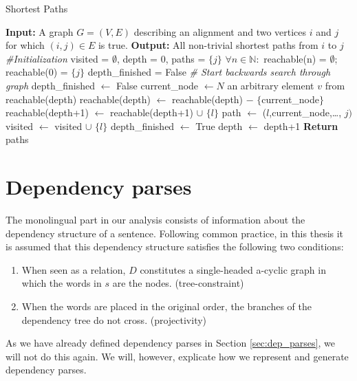 \begin{algorithm}
\caption{Shortest Paths}\label{alg:shortest paths}
\begin{algorithmic}
\STATE \textbf{Input:} A graph $G = (V,E)$ describing an alignment and two vertices $i$ and $j$ for which $(i,j)\in E$ is true.
\STATE \textbf{Output:} All non-trivial shortest paths from $i$ to $j$
\STATE \textit{\#Initialization}
\STATE visited = $\emptyset$, depth = $0$, paths = $\{j\}$
\STATE $\forall n\in\mathbb{N}:$ reachable(n) = $\emptyset$; reachable($0$) = $\{j\}$
\STATE depth\_finished = False
\STATE \textit{\# Start backwards search through graph}
		\STATE depth\_finished $\leftarrow$ False
		\STATE current\_node $\leftarrow N$ an arbitrary element $v$ from reachable(depth)
		\STATE reachable(depth) $\leftarrow$ reachable(depth) $-$ $\{$current\_node$\}$
				\STATE reachable(depth+1) $\leftarrow$ reachable(depth+1) $\cup$ $\{l\}$
					\STATE path $\leftarrow$ ($l$,current\_node,\ldots, $j)$
				\ENDFOR
			\ENDIF
		\STATE visited $\leftarrow$ visited $\cup$ $\{l\}$
		\ENDFOR
	\STATE depth\_finished $\leftarrow$ True
	\STATE depth $\leftarrow$ depth+1
	\ENDWHILE
\ENDWHILE
\STATE \textbf{Return} paths
\end{algorithmic}
\end{algorithm}


\section{Dependency parses}
\label{sec:depparses}

The monolingual part in our analysis consists of information about the dependency structure of a sentence. Following common practice, in this thesis it is assumed that this dependency structure satisfies the following two conditions:\begin{enumerate}
\item When seen as a relation, $D$ constitutes a single-headed a-cyclic graph in which the words in $s$ are the nodes. (tree-constraint)
\item When the words are placed in the original order, the branches of the dependency tree do not cross. (projectivity)
\end{enumerate}

As we have already defined dependency parses in Section \ref{sec:dep_parses}, we will not do this again. We will, however, explicate how we represent and generate dependency parses.

